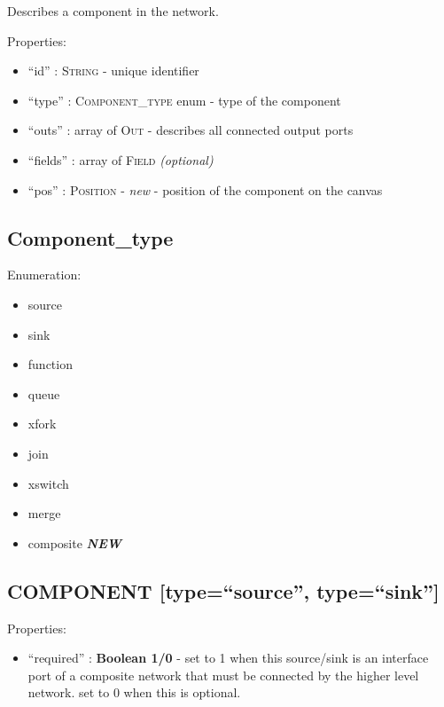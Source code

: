 Describes a component in the network.

Properties:

\begin{itemize}
\itemsep1pt\parskip0pt
\item
  ``id'' : \textsc{String} - unique identifier
\item
  ``type'' : \textsc{Component\_type} enum - type of the component
\item
  ``outs'' : array of \textsc{Out} - describes all connected output
  ports
\item
  ``fields'' : array of \textsc{Field} \emph{(optional)}
\item
  ``pos'' : \textsc{Position} - \emph{new} - position of the component
  on the canvas
\end{itemize}

\subsection{Component\_type}\label{componenttype}

Enumeration:

\begin{itemize}
\itemsep1pt\parskip0pt
\item
  source
\item
  sink
\item
  function
\item
  queue
\item
  xfork
\item
  join
\item
  xswitch
\item
  merge
\item
  composite \textbf{\emph{NEW}}
\end{itemize}

\subsection{COMPONENT {[}type=``source'',
type=``sink''{]}}\label{component-typesource-typesink}

Properties:

\begin{itemize}
\itemsep1pt\parskip0pt
\item
  ``required'' : \textbf{Boolean 1/0} - set to 1 when this source/sink
  is an interface port of a composite network that must be connected by
  the higher level network. set to 0 when this is optional.
\end{itemize}

